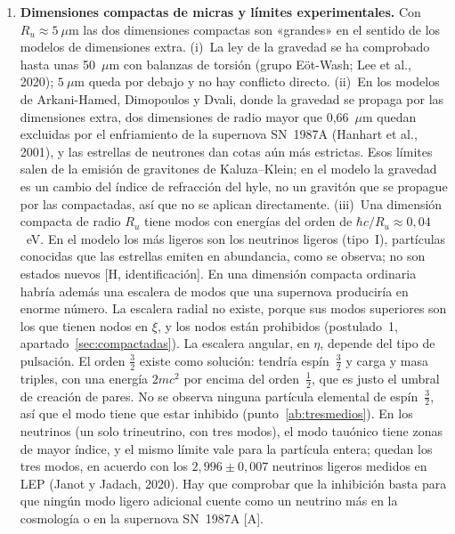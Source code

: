 \documentclass[11pt,a4paper]{article}
\newcommand{\st}[1]{\textup{[#1]}}
\begin{document}
\begin{enumerate}[label=\arabic*.,ref=\arabic*,leftmargin=*]
\item \label{ab:compactas}\textbf{Dimensiones compactas de micras y límites experimentales.} Con $R_u\approx5~\mu$m las dos dimensiones compactas son «grandes» en el sentido de los modelos de dimensiones extra. (i)~La ley de la gravedad se ha comprobado hasta unas 50~$\mu$m con balanzas de torsión (grupo Eöt-Wash; Lee et al., 2020); $5~\mu$m queda por debajo y no hay conflicto directo. (ii)~En los modelos de Arkani-Hamed, Dimopoulos y Dvali, donde la gravedad se propaga por las dimensiones extra, dos dimensiones de radio mayor que 0,66~$\mu$m quedan excluidas por el enfriamiento de la supernova SN~1987A (Hanhart et al., 2001), y las estrellas de neutrones dan cotas aún más estrictas. Esos límites salen de la emisión de gravitones de Kaluza--Klein; en el modelo la gravedad es un cambio del índice de refracción del hyle, no un gravitón que se propague por las compactadas, así que no se aplican directamente. (iii)~Una dimensión compacta de radio $R_u$ tiene modos con energías del orden de $\hbar c/R_u\approx0,04$~eV. En el modelo los más ligeros son los neutrinos ligeros (tipo~I), partículas conocidas que las estrellas emiten en abundancia, como se observa; no son estados nuevos \st{H, identificación}. En una dimensión compacta ordinaria habría además una escalera de modos que una supernova produciría en enorme número. La escalera radial no existe, porque sus modos superiores son los que tienen nodos en $\xi$, y los nodos están prohibidos (postulado~1, apartado~\ref{sec:compactadas}). La escalera angular, en $\eta$, depende del tipo de pulsación. El orden $\tfrac32$ existe como solución: tendría espín~$\tfrac32$ y carga y masa triples, con una energía $2mc^2$ por encima del orden~$\tfrac12$, que es justo el umbral de creación de pares. No se observa ninguna partícula elemental de espín~$\tfrac32$, así que el modo tiene que estar inhibido (punto~\ref{ab:tresmedios}). En los neutrinos (un solo trineutrino, con tres modos), el modo tauónico tiene zonas de mayor índice, y el mismo límite vale para la partícula entera; quedan los tres modos, en acuerdo con los $2,996\pm0,007$ neutrinos ligeros medidos en LEP (Janot y Jadach, 2020). Hay que comprobar que la inhibición basta para que ningún modo ligero adicional cuente como un neutrino más en la cosmología o en la supernova SN~1987A \st{A}.


\end{enumerate}
\end{document}
